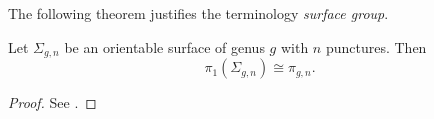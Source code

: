 The following theorem justifies the terminology \emph{surface group}.

\begin{theorem}
    Let $\Sigma_{g,n}$ be an orientable surface of genus $g$ with $n$ punctures. Then
    \[
        \pi_1(\Sigma_{g,n}) \cong \pi_{g,n}.
    \]
\end{theorem}

\begin{proof}
    See \cite[Thm.\ 1]{casimiroCharacterVarietiesTheir2026}.
\end{proof}
